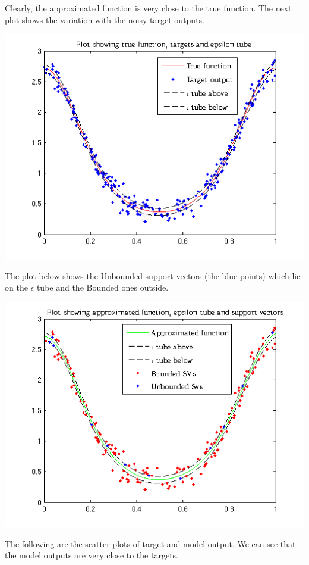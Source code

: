 \documentclass{article}
\begin{document}
Clearly, the approximated function is very close to the true function. The next plot shows the variation with the noisy target outputs.
\begin{center}
\includegraphics[scale=1]{Regression/nu/Plot_2}
\end{center}
The plot below shows the Unbounded support vectors (the blue points) which lie on the $\epsilon$ tube and the Bounded ones outside.
\begin{center}
\includegraphics[scale=1]{Regression/nu/Plot_3}
\end{center}
The following are the scatter plots of target and model output. We can see that the model outputs are very close to the targets. 
\end{document}
